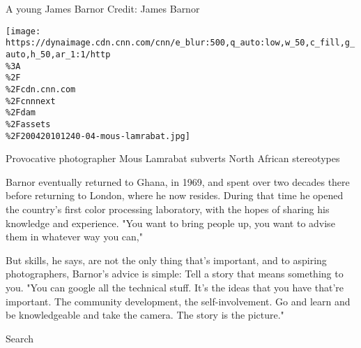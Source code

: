A young James Barnor Credit: James Barnor

\href{/style/article/mous-lamrabat-photography/index.html}{}

\texttt{[image: https://dynaimage.cdn.cnn.com/cnn/e\_blur:500,q\_auto:low,w\_50,c\_fill,g\_auto,h\_50,ar\_1:1/http\\\%3A\\\%2F\\\%2Fcdn.cnn.com\\\%2Fcnnnext\\\%2Fdam\\\%2Fassets\\\%2F200420101240-04-mous-lamrabat.jpg]}

Provocative photographer Mous Lamrabat subverts North African
stereotypes

Barnor eventually returned to Ghana, in 1969, and spent over two decades
there before returning to London, where he now resides. During that time
he opened the country's first color processing laboratory, with the
hopes of sharing his knowledge and experience. "You want to bring people
up, you want to advise them in whatever way you can,"

But skills, he says, are not the only thing that's important, and to
aspiring photographers, Barnor's advice is simple: Tell a story that
means something to you. "You can google all the technical stuff. It's
the ideas that you have that're important. The community development,
the self-involvement. Go and learn and be knowledgeable and take the
camera. The story is the picture."

Search


